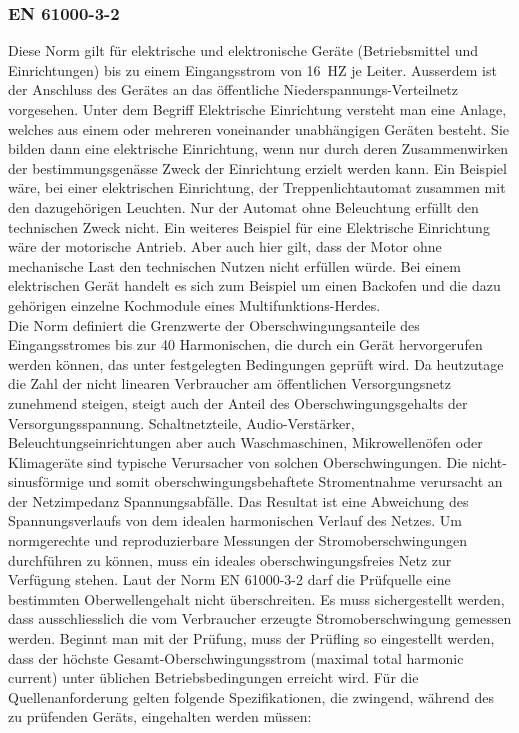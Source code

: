 \subsubsection{EN 61000-3-2}
Diese Norm gilt für elektrische und elektronische Geräte (Betriebsmittel und Einrichtungen) bis zu einem Eingangsstrom von \SI{16}{HZ} je Leiter. Ausserdem ist der Anschluss des Gerätes an das öffentliche Niederspannungs-Verteilnetz vorgesehen. Unter dem Begriff Elektrische Einrichtung versteht man eine Anlage, welches aus einem oder mehreren voneinander unabhängigen Geräten besteht. Sie bilden dann eine elektrische Einrichtung, wenn nur durch deren Zusammenwirken der bestimmungsgenässe Zweck der Einrichtung erzielt werden kann. Ein Beispiel wäre, bei einer elektrischen Einrichtung, der Treppenlichtautomat zusammen mit den dazugehörigen Leuchten. Nur der Automat ohne Beleuchtung erfüllt den technischen Zweck nicht. Ein weiteres Beispiel für eine Elektrische Einrichtung wäre der motorische Antrieb. Aber auch hier gilt, dass der Motor ohne mechanische Last den technischen Nutzen nicht erfüllen würde. Bei einem elektrischen Gerät handelt es sich zum Beispiel um einen Backofen und die dazu gehörigen einzelne Kochmodule eines Multifunktions-Herdes.\\
Die Norm definiert die Grenzwerte der Oberschwingungsanteile des Eingangsstromes bis zur 40 Harmonischen, die durch ein Gerät hervorgerufen werden können, das unter festgelegten Bedingungen geprüft wird. Da heutzutage die Zahl der nicht linearen Verbraucher am öffentlichen Versorgungsnetz zunehmend steigen, steigt auch der Anteil des Oberschwingungsgehalts der Versorgungsspannung. Schaltnetzteile, Audio-Verstärker, Beleuchtungseinrichtungen aber auch Waschmaschinen, Mikrowellenöfen oder Klimageräte sind typische Verursacher von solchen Oberschwingungen.
Die nicht-sinusförmige und somit oberschwingungsbehaftete Stromentnahme verursacht an der Netzimpedanz Spannungsabfälle. Das Resultat ist eine Abweichung des Spannungsverlaufs von dem idealen harmonischen Verlauf des Netzes. Um normgerechte und reproduzierbare Messungen der Stromoberschwingungen durchführen zu können, muss ein ideales oberschwingungsfreies Netz zur Verfügung stehen. Laut der Norm EN 61000-3-2 darf die Prüfquelle eine bestimmten Oberwellengehalt nicht überschreiten. Es muss sichergestellt werden, dass ausschliesslich die vom Verbraucher erzeugte Stromoberschwingung gemessen werden. Beginnt man mit der Prüfung, muss der Prüfling so eingestellt werden, dass der höchste Gesamt-Oberschwingungsstrom (maximal total harmonic current) unter üblichen Betriebsbedingungen erreicht wird.
Für die Quellenanforderung gelten folgende Spezifikationen, die zwingend, während des zu prüfenden Geräts, eingehalten werden müssen:

